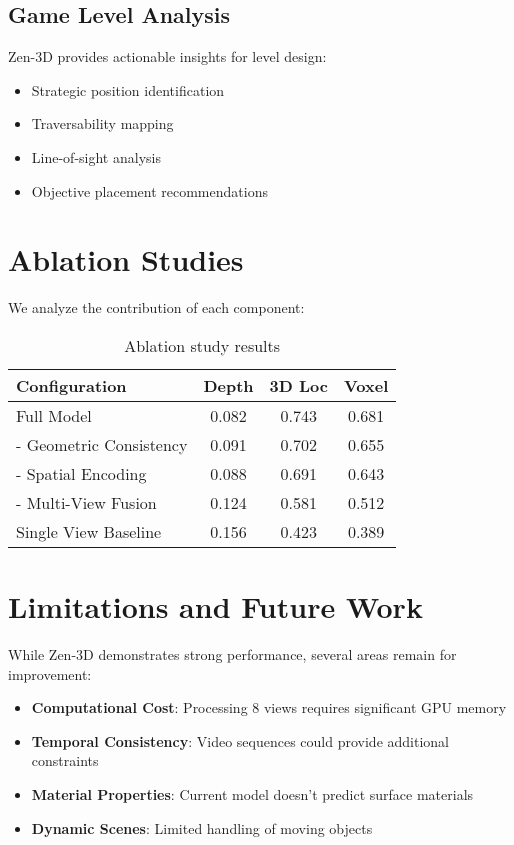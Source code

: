\documentclass[11pt,a4paper]{article}
\begin{document}
\subsection{Game Level Analysis}

Zen-3D provides actionable insights for level design:

\begin{itemize}
\item Strategic position identification
\item Traversability mapping
\item Line-of-sight analysis
\item Objective placement recommendations
\end{itemize}

\section{Ablation Studies}

We analyze the contribution of each component:

\begin{table}[h]
\centering
\begin{tabular}{lccc}
\toprule
Configuration & Depth & 3D Loc & Voxel \\
\midrule
Full Model & 0.082 & 0.743 & 0.681 \\
- Geometric Consistency & 0.091 & 0.702 & 0.655 \\
- Spatial Encoding & 0.088 & 0.691 & 0.643 \\
- Multi-View Fusion & 0.124 & 0.581 & 0.512 \\
Single View Baseline & 0.156 & 0.423 & 0.389 \\
\bottomrule
\end{tabular}
\caption{Ablation study results}
\end{table}

\section{Limitations and Future Work}

While Zen-3D demonstrates strong performance, several areas remain for improvement:

\begin{itemize}
\item \textbf{Computational Cost}: Processing 8 views requires significant GPU memory
\item \textbf{Temporal Consistency}: Video sequences could provide additional constraints
\item \textbf{Material Properties}: Current model doesn't predict surface materials
\item \textbf{Dynamic Scenes}: Limited handling of moving objects
\end{itemize}
\end{document}
